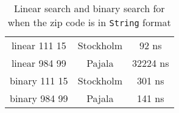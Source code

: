 \documentclass[a4paper,11pt]{article}
\begin{document}
\begin{table}[h!]
    \begin{center}
        \caption{Linear search and binary search for when the zip code is in {\tt String} format}
        \label{tab:StringZip}
        \begin{tabular}{|c|c|c|}
            \hline
            linear 111 15 & Stockholm & 92 ns    \\
            linear 984 99 & Pajala    & 32224 ns \\
            binary 111 15 & Stockholm & 301 ns   \\
            binary 984 99 & Pajala    & 141 ns   \\
            \hline
        \end{tabular}
    \end{center}
\end{table}
\end{document}
